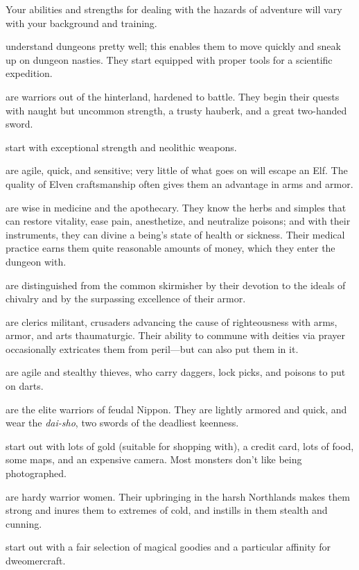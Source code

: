 Your abilities and strengths for dealing with the hazards of adventure
will vary with your background and training.

%
\blist{}
\item[\bb{Archeologists}]%
understand dungeons pretty well; this enables them
to move quickly and sneak up on dungeon nasties.  They start equipped
with proper tools for a scientific expedition.
%
\item[\bb{Barbarians}]%
are warriors out of the hinterland, hardened to battle.
They begin their quests with naught but uncommon strength, a trusty hauberk,
and a great two-handed sword.
%
\item[\bb{Cavemen {\rm and} Cavewomen}]
start with exceptional strength and neolithic weapons.
%
\item[\bb{Elves}]%
are agile, quick, and sensitive; very little of what goes
on will escape an Elf.  The quality of Elven craftsmanship often gives
them an advantage in arms and armor.
%
\item[\bb{Healers}]%
are wise in medicine and the apothecary.  They know the
herbs and simples that can restore vitality, ease pain, anesthetize,
and neutralize
poisons; and with their instruments, they can divine a being's state
of health or sickness.  Their medical practice earns them quite reasonable
amounts of money, which they enter the dungeon with.
%
\item[\bb{Knights}]%
are distinguished from the common skirmisher by their
devotion to the ideals of chivalry and by the surpassing excellence of
their armor.
%
\item[\bb{Priests {\rm and} Priestesses}]%
are clerics militant, crusaders
advancing the cause of righteousness with arms, armor, and arts
thaumaturgic.  Their ability to commune with deities via prayer
occasionally extricates them from peril---but can also put them in it.
%
\item[\bb{Rogues}]%
are agile and stealthy thieves, who carry daggers, lock
picks, and poisons to put on darts.
%
\item[\bb{Samurai}]%
are the elite warriors of feudal Nippon.  They are lightly
armored and quick, and wear the %
{\it dai-sho}, two swords of the deadliest
keenness.
%
\item[\bb{Tourists}]%
start out with lots of gold (suitable for shopping with),
a credit card, lots of food, some maps, and an expensive camera.  Most
monsters don't like being photographed.
%
\item[\bb{Valkyries}]%
are hardy warrior women.  Their upbringing in the harsh
Northlands makes them strong and inures them to extremes of cold, and instills
in them stealth and cunning.
%
\item[\bb{Wizards}]%
start out with a fair selection of magical goodies and
a particular affinity for dweomercraft.
\elist

